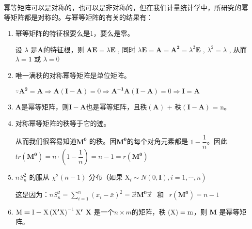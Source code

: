    幂等矩阵可以是对称的，也可以是非对称的，但在我们计量统计学中，所研究的幂等矩阵都是对称的。与幂等矩阵的有关的结果有：
   \begin{enumerate}[1)]
   
   	\item 幂等矩阵的特征根要么是1，要么是零。
   	
 \begin{myproof}
		设 $ \lambda $ 是$ \boldsymbol{A} $的特征根，则  $ \boldsymbol{A E}=\lambda \boldsymbol{E}$ , 同时 
	$ \lambda \boldsymbol{E =A=A^{2}}=\lambda^{2} \boldsymbol{E} $ ,  $ \lambda^{2}=\lambda$ , 
	从而 $  \lambda=1 $  或  $ \lambda=0$ 
 \end{myproof}
  
   	\item 唯一满秩的对称幂等矩阵是单位矩阵。
   	
  \begin{myproof}
	$ \because \boldsymbol{A^{2}=A} \Rightarrow \boldsymbol{A(I-A)}=0 \Rightarrow \boldsymbol{A^{-1} A(I-A)}=0 \Longrightarrow \boldsymbol{I=A} $
  \end{myproof}
   	\item $ \boldsymbol{A} $是幂等矩阵，则$\boldsymbol{I-A}$也是幂等矩阵，且秩$ \boldsymbol{(A)} $ + 秩$ \boldsymbol{(I - A)} $ = n。
   	\item 对称幂等矩阵的秩等于它的迹。
   	
   	\setlength{\parindent}{2\ccwd}
   	从而我们很容易知道$ \boldsymbol{M^{0}} $ 的秩。因$ \boldsymbol{M^{0}} $的每个对角元素都是 $ 1 - \dfrac{1}{n} $。因此
   	$ {tr} \left(\boldsymbol{M^{0}}\right) = n \cdot\left(1-\dfrac{1}{n}\right)
   	= n-1 = r\left(\boldsymbol{M^{0}}\right) $
   \item 
   $ \left.n S_{n}^{2} \text { 的服从 } \chi^{2}(n-1) \text { 分布（如果 } 
   \mathrm{X}_{i} \sim N(0, \boldsymbol{I}), i=1 ,\cdots , n\right) $ 
   
   这是因为：$ n S_{n}^{2}=\sum_{i=1}^{n}\left(x_{i}-\bar{x}\right)^{2}=\vec{x} \boldsymbol{M^{0}} \vec{x} \ \
   \text { 和 } \ \  r \left(\boldsymbol{ M^{0} }\right)=n-1 $
   
   \item $ \rm \boldsymbol{ M = I-X }\left( \boldsymbol{X^{\prime} X } \right)^{-1} \boldsymbol{ X^{\prime}} $ \quad $\boldsymbol{ X }$
   是一个$n \times m$的矩阵，秩
   $ \rm (\boldsymbol{X}) = m $，则 $\boldsymbol{M}$ 是幂等矩阵。
   \end{enumerate}

